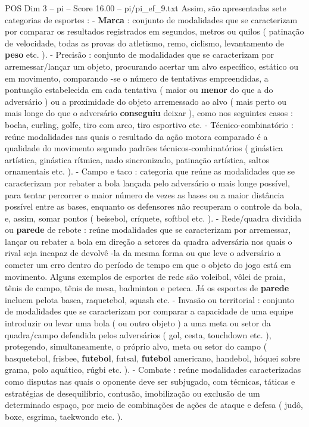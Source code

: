 \begin{textsample}{POS Dim 3 – pi – Score 16.00 – pi/pi\_ef\_9.txt}
Assim, são apresentadas sete categorias de esportes : - \textbf{Marca} : conjunto de modalidades que se caracterizam por comparar os resultados registrados em segundos, metros ou quilos ( patinação de velocidade, todas as provas do atletismo, remo, ciclismo, levantamento de \textbf{peso} etc. ). - Precisão : conjunto de modalidades que se caracterizam por arremessar/lançar um objeto, procurando acertar um alvo específico, estático ou em movimento, comparando -se o número de tentativas empreendidas, a pontuação estabelecida em cada tentativa ( maior ou \textbf{menor} do que a do adversário ) ou a proximidade do objeto arremessado ao alvo ( mais perto ou mais longe do que o adversário \textbf{conseguiu} deixar ), como nos seguintes casos : bocha, curling, golfe, tiro com arco, tiro esportivo etc. - Técnico-combinatório : reúne modalidades nas quais o resultado da ação motora comparado é a qualidade do movimento segundo padrões técnicos-combinatórios ( ginástica artística, ginástica rítmica, nado sincronizado, patinação artística, saltos ornamentais etc. ). - Campo e taco : categoria que reúne as modalidades que se caracterizam por rebater a bola lançada pelo adversário o mais longe possível, para tentar percorrer o maior número de vezes as bases ou a maior distância possível entre as bases, enquanto os defensores não recuperam o controle da bola, e, assim, somar pontos ( beisebol, críquete, softbol etc. ). - Rede/quadra dividida ou \textbf{parede} de rebote : reúne modalidades que se caracterizam por arremessar, lançar ou rebater a bola em direção a setores da quadra adversária nos quais o rival seja incapaz de devolvê -la da mesma forma ou que leve o adversário a cometer um erro dentro do período de tempo em que o objeto do jogo está em movimento.
Alguns exemplos de esportes de rede são voleibol, vôlei de praia, tênis de campo, tênis de mesa, badminton e peteca.
Já os esportes de \textbf{parede} incluem pelota basca, raquetebol, squash etc. - Invasão ou territorial : conjunto de modalidades que se caracterizam por comparar a capacidade de uma equipe introduzir ou levar uma bola ( ou outro objeto ) a uma meta ou setor da quadra/campo defendida pelos adversários ( gol, cesta, touchdown etc. ), protegendo, simultaneamente, o próprio alvo, meta ou setor do campo ( basquetebol, frisbee, \textbf{futebol}, futsal, \textbf{futebol} americano, handebol, hóquei sobre grama, polo aquático, rúgbi etc. ). - Combate : reúne modalidades caracterizadas como disputas nas quais o oponente deve ser subjugado, com técnicas, táticas e estratégias de desequilíbrio, contusão, imobilização ou exclusão de um determinado espaço, por meio de combinações de ações de ataque e defesa ( judô, boxe, esgrima, taekwondo etc. ).

\end{textsample}

